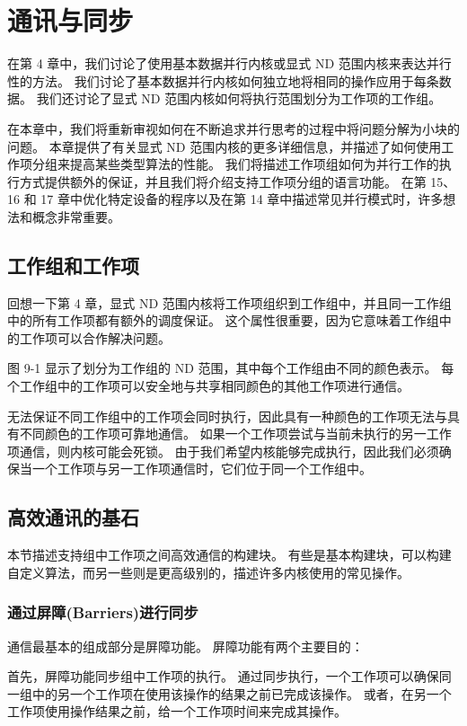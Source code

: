 \section{通讯与同步}
在第 4 章中，我们讨论了使用基本数据并行内核或显式 ND 范围内核来表达并行性的方法。 我们讨论了基本数据并行内核如何独立地将相同的操作应用于每条数据。 我们还讨论了显式 ND 范围内核如何将执行范围划分为工作项的工作组。

在本章中，我们将重新审视如何在不断追求并行思考的过程中将问题分解为小块的问题。 本章提供了有关显式 ND 范围内核的更多详细信息，并描述了如何使用工作项分组来提高某些类型算法的性能。 我们将描述工作项组如何为并行工作的执行方式提供额外的保证，并且我们将介绍支持工作项分组的语言功能。 在第 15、16 和 17 章中优化特定设备的程序以及在第 14 章中描述常见并行模式时，许多想法和概念非常重要。

\subsection{工作组和工作项}
回想一下第 4 章，显式 ND 范围内核将工作项组织到工作组中，并且同一工作组中的所有工作项都有额外的调度保证。 这个属性很重要，因为它意味着工作组中的工作项可以合作解决问题。

图 9-1 显示了划分为工作组的 ND 范围，其中每个工作组由不同的颜色表示。 每个工作组中的工作项可以安全地与共享相同颜色的其他工作项进行通信。

无法保证不同工作组中的工作项会同时执行，因此具有一种颜色的工作项无法与具有不同颜色的工作项可靠地通信。 如果一个工作项尝试与当前未执行的另一工作项通信，则内核可能会死锁。 由于我们希望内核能够完成执行，因此我们必须确保当一个工作项与另一工作项通信时，它们位于同一个工作组中。

\subsection{高效通讯的基石}
本节描述支持组中工作项之间高效通信的构建块。 有些是基本构建块，可以构建自定义算法，而另一些则是更高级别的，描述许多内核使用的常见操作。

\subsubsection{通过屏障(Barriers)进行同步}
通信最基本的组成部分是屏障功能。 屏障功能有两个主要目的：

首先，屏障功能同步组中工作项的执行。 通过同步执行，一个工作项可以确保同一组中的另一个工作项在使用该操作的结果之前已完成该操作。 或者，在另一个工作项使用操作结果之前，给一个工作项时间来完成其操作。

